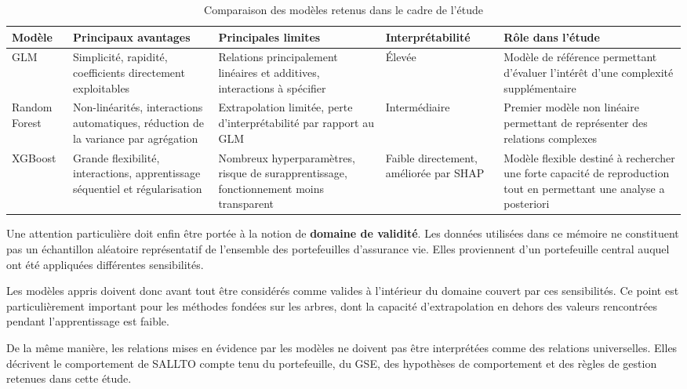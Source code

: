 \begin{table}[htbp]
\centering
\small
\caption{Comparaison des modèles retenus dans le cadre de l'étude}
\label{tab:comparaison_modeles}
\renewcommand{\arraystretch}{1.4}
\begin{tabular}{p{2.3cm} p{3cm} p{3cm} p{3cm} p{3cm}}
\hline
\textbf{Modèle}
&
\textbf{Principaux avantages}
&
\textbf{Principales limites}
&
\textbf{Interprétabilité}
&
\textbf{Rôle dans l'étude}
\\
\hline

GLM
&
Simplicité, rapidité, coefficients directement exploitables
&
Relations principalement linéaires et additives, interactions à spécifier
&
Élevée
&
Modèle de référence permettant d'évaluer l'intérêt d'une complexité supplémentaire
\\

Random Forest
&
Non-linéarités, interactions automatiques, réduction de la variance par agrégation
&
Extrapolation limitée, perte d'interprétabilité par rapport au GLM
&
Intermédiaire
&
Premier modèle non linéaire permettant de représenter des relations complexes
\\

XGBoost
&
Grande flexibilité, interactions, apprentissage séquentiel et régularisation
&
Nombreux hyperparamètres, risque de surapprentissage, fonctionnement moins transparent
&
Faible directement, améliorée par SHAP
&
Modèle flexible destiné à rechercher une forte capacité de reproduction tout en permettant une analyse a posteriori
\\

\hline
\end{tabular}
\end{table}

Une attention particulière doit enfin être portée à la notion de \textbf{domaine de validité}. Les données utilisées dans ce mémoire ne constituent pas un échantillon aléatoire représentatif de l'ensemble des portefeuilles d'assurance vie. Elles proviennent d'un portefeuille central auquel ont été appliquées différentes sensibilités.

Les modèles appris doivent donc avant tout être considérés comme valides à l'intérieur du domaine couvert par ces sensibilités. Ce point est particulièrement important pour les méthodes fondées sur les arbres, dont la capacité d'extrapolation en dehors des valeurs rencontrées pendant l'apprentissage est faible.

De la même manière, les relations mises en évidence par les modèles ne doivent pas être interprétées comme des relations universelles. Elles décrivent le comportement de SALLTO compte tenu du portefeuille, du GSE, des hypothèses de comportement et des règles de gestion retenues dans cette étude.


